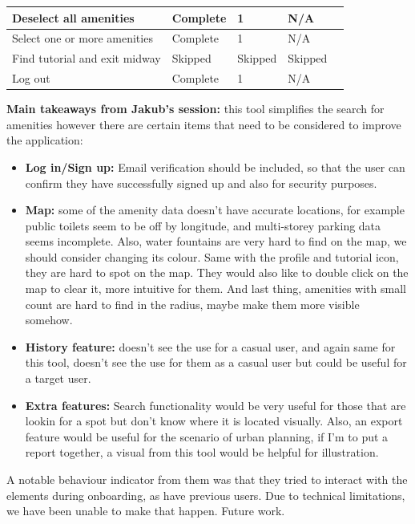 \begin{table}[h!]
\begin{tabular}{|p{}|p{}|p{}|p{}|p{}|}
        \hline
        Deselect all amenities        & Complete        & 1                   & N/A                \\
        \hline
        Select one or more amenities  & Complete        & 1                   & N/A                \\
        \hline
        Find tutorial and exit midway & Skipped         & Skipped             & Skipped            \\
        \hline
        Log out                       & Complete        & 1                   & N/A                \\
        \hline
    \end{tabular}
\end{table}
\textbf{Main takeaways from Jakub's session: }this tool simplifies the search for amenities however there are certain items that need to be considered to improve the application:
\begin{itemize}
    \item \textbf{Log in/Sign up: }Email verification should be included, so that the user can confirm they have successfully signed up and also for security purposes.
    \item \textbf{Map: }some of the amenity data doesn't have accurate locations, for example public toilets seem to be off by longitude, and multi-storey parking data seems incomplete. Also, water fountains are very hard to find on the map, we should consider changing its colour. Same with the profile and tutorial icon, they are hard to spot on the map. They would also like to double click on the map to clear it, more intuitive for them. And last thing, amenities with small count are hard to find in the radius, maybe make them more visible somehow.
    \item \textbf{History feature: }doesn't see the use for a casual user, and again same for this tool, doesn't see the use for them as a casual user but could be useful for a target user.
    \item \textbf{Extra features: }Search functionality would be very useful for those that are lookin for a spot but don't know where it is located visually. Also, an export feature would be useful for the scenario of urban planning, if I'm to put a report together, a visual from this tool would be helpful for illustration.
\end{itemize}
A notable behaviour indicator from them was that they tried to interact with the elements during onboarding, as have previous users. Due to technical limitations, we have been unable to make that happen. Future work.\\\\
